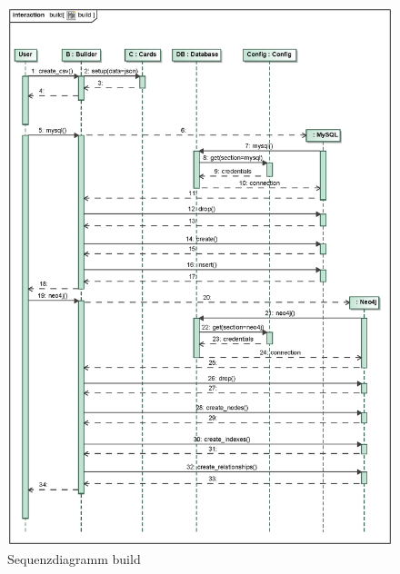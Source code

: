 \begin{figure}[H]
    \myfloatalign
    \includegraphics[width=\textwidth]{gfx/MtGDeepAnalysis/build.eps}
    \caption{Sequenzdiagramm build} %
    \label{fig:seq:build}
\end{figure}